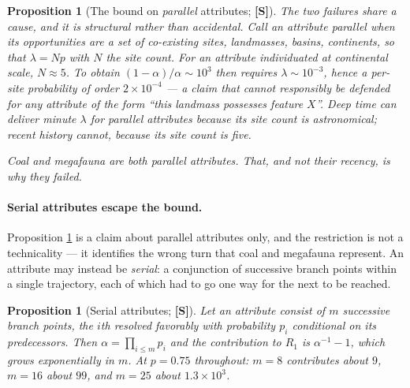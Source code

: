 \documentclass[11pt]{article}
\numberwithin{equation}{section}
\theoremstyle{plain}
\newtheorem{proposition}[theorem]{Proposition}
\theoremstyle{definition}
\theoremstyle{remark}
\begin{document}
\begin{proposition}[The bound on \emph{parallel} attributes;
\textbf{[S]}]\label{gc:prop:squeeze}
The two failures share a cause, and it is structural rather than
accidental. Call an attribute \emph{parallel} when its opportunities are
a set of co-existing sites, landmasses, basins, continents, so
that $\lambda=Np$ with $N$ the site count. For an attribute individuated
at continental scale, $N\approx5$. To obtain
$(1-\alpha)/\alpha\sim10^{3}$ then requires $\lambda\sim10^{-3}$, hence
a per-site probability of order $2\times10^{-4}$ --- a claim that cannot
responsibly be defended for any attribute of the form ``this landmass
possesses feature $X$''. Deep time can deliver minute $\lambda$ for
parallel attributes because its site count is astronomical; recent
history cannot, because its site count is five.

Coal and megafauna are both parallel attributes. That, and not their
recency, is why they failed.
\end{proposition}

\paragraph{Serial attributes escape the bound.} Proposition
\ref{gc:prop:squeeze} is a claim about parallel attributes only, and the
restriction is not a technicality --- it identifies the wrong turn that
coal and megafauna represent. An attribute may instead be
\emph{serial}: a conjunction of successive branch points within a single
trajectory, each of which had to go one way for the next to be reached.

\begin{proposition}[Serial attributes; \textbf{[S]}]
\label{gc:prop:cascade}
Let an attribute consist of $m$ successive branch points, the $i$th
resolved favorably with probability $p_i$ conditional on its
predecessors. Then $\alpha=\prod_{i\le m}p_i$ and the contribution to
$R_1$ is $\alpha^{-1}-1$, which grows \emph{exponentially in $m$}. At
$p=0.75$ throughout: $m=8$ contributes about $9$, $m=16$ about $99$,
and $m=25$ about $1.3\times10^{3}$.
\end{proposition}
\end{document}
